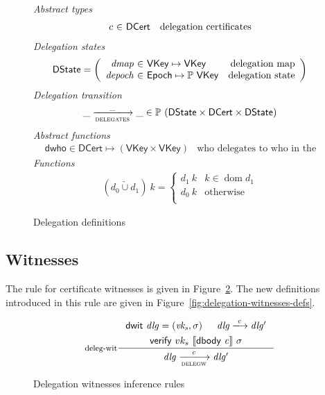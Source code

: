 \documentclass[11pt,a4paper]{article}
\DeclareMathOperator{\dom}{dom}
\newcommand{\powerset}[1]{\mathbb{P}~#1}
\newcommand{\unionoverride}{\mathbin{\underrightarrow\cup}}
\newcommand{\var}[1]{\mathit{#1}}
\newcommand{\fun}[1]{\mathsf{#1}}
\newcommand{\type}[1]{\mathsf{#1}}
\newcommand{\trans}[2]{\xlongrightarrow[\textsc{#1}]{#2}}
\newcommand{\VKey}{\type{VKey}}
\newcommand{\DCert}{\type{DCert}}
\newcommand{\DState}{\type{DState}}
\newcommand{\Epoch}{\type{Epoch}}
\newcommand{\verify}[3]{\fun{verify} ~ #1 ~ #2 ~ #3}
\newcommand{\serialised}[1]{\llbracket \var{#1} \rrbracket}
\newcommand{\dbody}[1]{\fun{dbody}~\var{#1}}
\newcommand{\dwit}[1]{\fun{dwit}~\var{#1}}
\begin{document}
\begin{figure}
  \emph{Abstract types}
  \begin{equation*}
    \begin{array}{r@{~\in~}lr}
      c & \DCert  & \text{delegation certificates}\\
    \end{array}
  \end{equation*}
  \emph{Delegation states}
  \begin{equation*}
    \DState =
    \left(\begin{array}{r@{~\in~}lr}
      \var{dmap} & \VKey \mapsto \VKey & \text{delegation map}\\
      \var{depoch} & \Epoch \mapsto \powerset{\VKey} & \text{delegation state}
    \end{array}\right)
  \end{equation*}
  \emph{Delegation transition}
  \begin{equation*}
    \_ \trans{delegates}{\_} \_ \in
      \powerset (\DState \times \DCert \times \DState)
  \end{equation*}
  \emph{Abstract functions}
  \begin{align*}
    & \fun{dwho} \in \DCert \mapsto (\VKey \times \VKey) & \text{who delegates to who in the certificate}
  \end{align*}
  \emph{Functions}
  \begin{align*}
    (d_0 \unionoverride d_1)~k=
    \begin{cases}
      d_1~k & k \in \dom d_1\\
      d_0~k & \text{otherwise}\\
    \end{cases}
  \end{align*}
  \caption{Delegation definitions}
  \label{fig:delegation-defs}
\end{figure}

\subsection{Witnesses}
\label{sec:delegation-witnesses}

The rule for certificate witnesses is given in
Figure~\ref{fig:deleg-witnesses}. The new definitions introduced in this rule
are given in Figure~\ref{fig:delegation-witnesses-defs}.

\begin{figure}
  \begin{equation}
    \label{eq:deleg-witnesses}
    \inference[deleg-wit]
    { \dwit{dlg} = (\var{vk_s}, \sigma) & \var{dlg} \trans{}{c} \var{dlg'} \\
      \verify{vk_s}{\serialised{\dbody{c}}}{\sigma}
    }
    {\var{dlg} \trans{delegw}{c} \var{dlg'}}
  \end{equation}
  \caption{Delegation witnesses inference rules}
  \label{fig:deleg-witnesses}
\end{figure}
\end{document}
